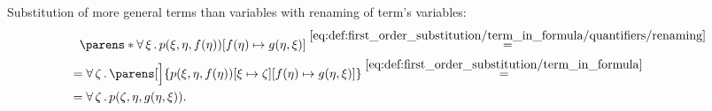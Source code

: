 \begin{example}
\begin{thmenum}
     Substitution of more general terms than variables with renaming of term's variables:
    \begin{align*}
      &{}\phantom{=}{}
      \parens*{\qforall{\xi} p(\xi, \eta, f(\eta))}[f(\eta) \mapsto g(\eta, \xi)]
      \overset {\eqref{eq:def:first_order_substitution/term_in_formula/quantifiers/renaming}} = \\ &=
      \qforall{\zeta} \parens[\Big]{p(\xi, \eta, f(\eta))[\xi \mapsto \zeta][f(\eta) \mapsto g(\eta, \xi)]}
      \overset {\eqref{eq:def:first_order_substitution/term_in_formula}} = \\ &=
      \qforall{\zeta} p(\zeta, \eta, g(\eta, \xi)).
    \end{align*}
  \end{thmenum}
\end{example}

